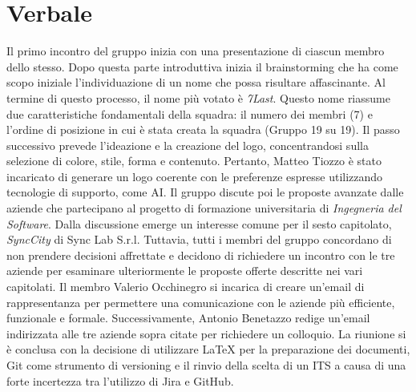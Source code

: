 \documentclass[italian,12pt]{article} %
\begin{document}
\newpage

\section{Verbale}
\begin{flushleft}
Il primo incontro del gruppo inizia con una presentazione di ciascun membro dello stesso.
Dopo questa parte introduttiva inizia il brainstorming che ha come scopo iniziale l’individuazione di un nome che possa risultare affascinante.
Al termine di questo processo, il nome più votato è \textit{7Last}. Questo nome riassume due caratteristiche fondamentali della squadra: il numero dei membri (7) e l'ordine di posizione in cui è stata creata la squadra (Gruppo 19 su 19).
Il passo successivo prevede l'ideazione e la creazione del logo, concentrandosi sulla selezione di colore, stile, forma e contenuto.
Pertanto, Matteo Tiozzo è stato incaricato di generare un logo coerente con le preferenze espresse utilizzando tecnologie di supporto, come AI.
Il gruppo discute poi le proposte avanzate dalle aziende che partecipano al progetto di formazione universitaria di \textit{Ingegneria del Software}. Dalla discussione emerge un interesse comune per il sesto capitolato, \textit{SyncCity} di Sync Lab S.r.l. Tuttavia, tutti i membri del gruppo concordano di non prendere decisioni affrettate e decidono di richiedere un incontro con le tre aziende per esaminare ulteriormente le proposte offerte descritte nei vari capitolati. Il membro Valerio Occhinegro si incarica di creare un'email di rappresentanza per permettere una comunicazione con le aziende più efficiente, funzionale e formale. Successivamente, Antonio Benetazzo redige un'email indirizzata alle tre aziende sopra citate per richiedere un colloquio.
La riunione si è conclusa con la decisione di utilizzare LaTeX per la preparazione dei documenti, Git come strumento di versioning e il rinvio della scelta di un ITS a causa di una forte incertezza tra l'utilizzo di Jira e GitHub.

\end{flushleft}
\end{document}
